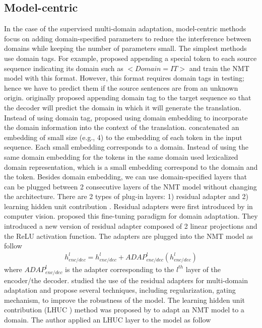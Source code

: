 \subsection{Model-centric}
In the case of the supervised multi-domain adaptation, model-centric methods focus on adding domain-specified parameters to reduce the interference between domains while keeping the number of parameters small. The simplest methods use domain tags. For example, \citet{Kobus17domain} proposed appending a special token to each source sequence indicating its domain such as $<Domain=IT>$ and train the NMT model with this format. However, this format requires domain tags in testing; hence we have to predict them if the source sentences are from an unknown origin. \citet{Britz17effective} originally proposed appending domain tag to the target sequence so that the decoder will predict the domain in which it will generate the translation. Instead of using domain tag, \citep{Kobus17domain, Pham19generic} proposed using domain embedding to incorporate the domain information into the context of the translation. \citet{Kobus17domain} concatenated an embedding of small size (e.g., 4) to the embedding of each token in the input sequence. Each small embedding corresponds to a domain. Instead of using the same domain embedding for the tokens in the same domain \citet{Pham19generic} used lexicalized domain representation, which is a small embedding correspond to the domain and the token. Besides domain embedding, we can use domain-specified layers that can be plugged between 2 consecutive layers of the NMT model without changing the architecture. There are 2 types of plug-in layers: 1) residual adapter \citep{Bapna19simple, Pham20Study} and 2) learning hidden unit contribution \citep{Vilar18learning}. Residual adapters were first introduced by \citet{Rebuffi17learning} in computer vision. \citet{Bapna19simple} proposed this fine-tuning paradigm for domain adaptation. They introduced a new version of residual adapter composed of 2 linear projections and the ReLU activation function. The adapters are plugged into the NMT model as follow
\begin{equation}
\begin{array}{rcl}
h_{enc/dec}^l = h_{enc/dec}^{l} + ADAP_{enc/dec}^l(h_{enc/dec}^{l})
\end{array}
\end{equation}
where $ADAP_{enc/dec}^l$ is the adapter corresponding to the $l^{th}$ layer of the encoder/the decoder. \citet{Pham20Study} studied the use of the residual adapters for multi-domain adaptation and propose several techniques, including regularization, gating mechanism, to improve the robustness of the model. The learning hidden unit contribution (LHUC ) method was proposed by \citet{Vilar18learning} to adapt an NMT model to a domain. The author applied an LHUC layer to the model as follow
